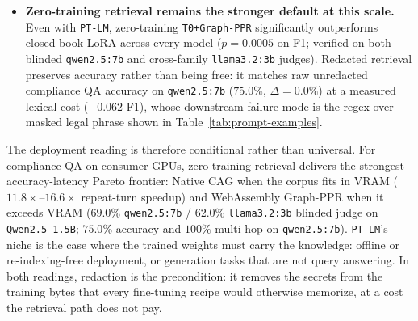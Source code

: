 \documentclass{article}
\begin{document}
\begin{itemize}
    \item \textbf{Zero-training retrieval remains the stronger default at this scale.} Even with \texttt{PT-LM}, zero-training \texttt{T0+Graph-PPR} significantly outperforms closed-book LoRA across every model ($p = 0.0005$ on F1; verified on both blinded \texttt{qwen2.5:7b} and cross-family \texttt{llama3.2:3b} judges). Redacted retrieval preserves accuracy rather than being free: it matches raw unredacted compliance QA accuracy on \texttt{qwen2.5:7b} ($75.0\%$, $\Delta=0.0\%$) at a measured lexical cost ($-0.062$ F1), whose downstream failure mode is the regex-over-masked legal phrase shown in Table~\ref{tab:prompt-examples}.
\end{itemize}

The deployment reading is therefore conditional rather than universal. For compliance QA on consumer GPUs, zero-training retrieval delivers the strongest accuracy-latency Pareto frontier: Native CAG when the corpus fits in VRAM ($11.8\times$--$16.6\times$ repeat-turn speedup) and WebAssembly Graph-PPR when it exceeds VRAM ($69.0\%$ \texttt{qwen2.5:7b} / $62.0\%$ \texttt{llama3.2:3b} blinded judge on \texttt{Qwen2.5-1.5B}; $75.0\%$ accuracy and $100\%$ multi-hop on \texttt{qwen2.5:7b}). \texttt{PT-LM}'s niche is the case where the trained weights must carry the knowledge: offline or re-indexing-free deployment, or generation tasks that are not query answering. In both readings, redaction is the precondition: it removes the secrets from the training bytes that every fine-tuning recipe would otherwise memorize, at a cost the retrieval path does not pay.



\end{document}
